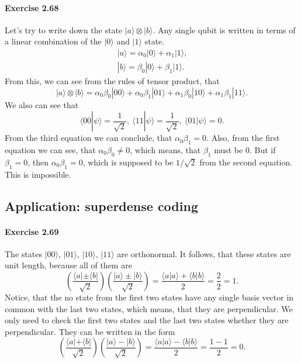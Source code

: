 \documentclass[a4paper,12pt]{article}
\newcommand{\exercise}[1]{\paragraph{Exercise #1}}
\newcommand{\la}{\langle}
\newcommand{\ra}{\rangle}
\begin{document}
    \exercise{2.68} Let's try to write down the state $|a \ra \otimes |b \ra$. Any single qubit is written in terms of a linear combination of the $|0\ra$ and $|1\ra$ state.
    \begin{gather}
        \nonumber
        |a \ra = \alpha_0 |0\ra + \alpha_1|1\ra \textrm{,}\\
        |b \ra = \beta_0 |0\ra + \beta_1|1\ra \textrm{.}
    \end{gather}
    From this, we can see from the rules of tensor product, that
    \begin{equation}
        |a\ra \otimes |b \ra = \alpha_0\beta_0|00\ra + \alpha_0\beta_1|01\ra + \alpha_1\beta_0|10\ra + \alpha_1\beta_1|11\ra \textrm{.}
    \end{equation}
    We also can see that
    \begin{equation}
        \la 00 | \psi \ra = \frac{1}{\sqrt{2}}, \ 
        \la 11 | \psi \ra = \frac{1}{\sqrt{2}}, \ 
        \la 01 | \psi \ra = 0\textrm{.}
    \end{equation}
    From the third equation we can conclude, that $\alpha_0\beta_1 = 0$. Also, from the first equation we can see, that $\alpha_0\beta_0 \neq 0$, which means, that $\beta_1$ must be 0. But if $\beta_1 = 0$, then $\alpha_0\beta_1 = 0$, which is supposed to be $1/\sqrt{2}$ from the second equation. This is impossible.

    \subsection{Application: superdense coding}

    \exercise{2.69} The states $|00\ra$, $|01\ra$, $|10\ra$, $|11\ra$ are orthonormal. It follows, that these states are unit length, because all of them are
    \begin{equation}
        \left( \frac{\la a| \pm \la b|}{\sqrt{2}} \right)
        \left( \frac{| a \ra \pm | b \ra}{\sqrt{2}} \right) =
        \frac{ \la a|a \ra + \la b | b \ra }{2} = \frac{2}{2} = 1 \textrm{.}
    \end{equation}
    Notice, that the no state from the first two states have any single basis vector in common with the last two states, which means, that they are perpendicular. We only need to check the first two states and the last two states whether they are perpendicular. They can be written in the form
    \begin{equation}
        \left( \frac{\la a| + \la b|}{\sqrt{2}} \right)
        \left( \frac{| a \ra - | b \ra}{\sqrt{2}} \right) =
        \frac{ \la a|a \ra - \la b | b \ra }{2} = \frac{1 - 1}{2} = 0 \textrm{.}
    \end{equation}
\end{document}
